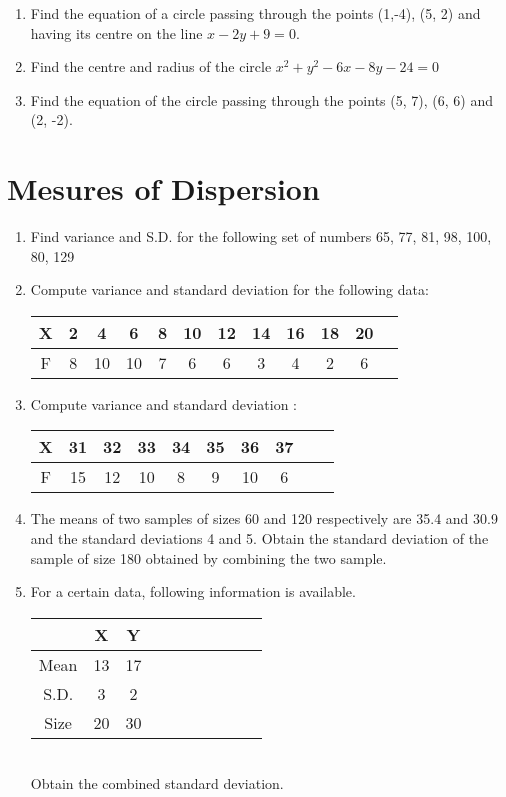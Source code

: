 \documentclass[14pt]{article}
\begin{document}
\begin{multicols}{2}
\begin{enumerate}[resume]
\item Find the equation of a circle passing through the points (1,-4), (5, 2) and having its centre on the line $x-2y+9 =0$.

\item Find the centre and radius of the circle $x^2 + y^2 - 6x - 8y - 24 = 0$ 

\item Find the equation of the circle passing through the points (5, 7), (6, 6) and (2, -2).

\end{enumerate} 


\section{Mesures of Dispersion}
\noindent
\begin{enumerate}[resume]
\item Find variance and S.D. for the following set of numbers 65, 77, 81, 98, 100, 80, 129

\item Compute variance and standard deviation for the following data:

\begin{tabular}{|c|*{11}{c|}}
\hline X & 2 & 4 & 6 & 8 & 10 & 12 & 14 & 16 & 18 & 20  \\
\hline F & 8 & 10 & 10 & 7 & 6 & 6 & 3 & 4 & 2 & 6 \\
\hline
\end{tabular}

\item Compute variance and standard deviation :

\begin{tabular}{|c|*{9}{c|}}
\hline X & 31 & 32 & 33 & 34 & 35 & 36 & 37 \\
\hline F & 15 & 12 & 10 & 8 & 9 & 10 & 6 \\
\hline
\end{tabular}

\item The means of two samples of sizes 60 and 120 respectively are 35.4 and 30.9 and the standard deviations 4 and 5. Obtain the standard deviation of the sample of size 180 obtained by combining the two sample.


\item For a certain data, following information is available.

\begin{tabular}{|c|*{9}{c|}}
\hline  & X & Y  \\
\hline Mean & 13 & 17  \\
\hline S.D. & 3 & 2  \\
\hline Size & 20 & 30  \\
\hline
\end{tabular}\\
\vspace{1mm}
Obtain the combined standard deviation.


\end{enumerate}
\end{multicols}
\end{document}
